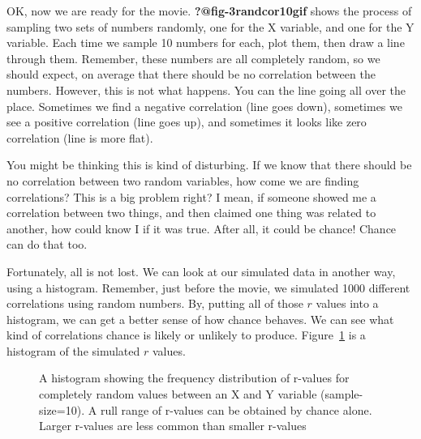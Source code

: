 \documentclass[
  letterpaper,
  DIV=11,
  numbers=noendperiod]{scrreprt}
\begin{document}
OK, now we are ready for the movie. \textbf{?@fig-3randcor10gif} shows
the process of sampling two sets of numbers randomly, one for the X
variable, and one for the Y variable. Each time we sample 10 numbers for
each, plot them, then draw a line through them. Remember, these numbers
are all completely random, so we should expect, on average that there
should be no correlation between the numbers. However, this is not what
happens. You can the line going all over the place. Sometimes we find a
negative correlation (line goes down), sometimes we see a positive
correlation (line goes up), and sometimes it looks like zero correlation
(line is more flat).

You might be thinking this is kind of disturbing. If we know that there
should be no correlation between two random variables, how come we are
finding correlations? This is a big problem right? I mean, if someone
showed me a correlation between two things, and then claimed one thing
was related to another, how could know I if it was true. After all, it
could be chance! Chance can do that too.

Fortunately, all is not lost. We can look at our simulated data in
another way, using a histogram. Remember, just before the movie, we
simulated 1000 different correlations using random numbers. By, putting
all of those \(r\) values into a histogram, we can get a better sense of
how chance behaves. We can see what kind of correlations chance is
likely or unlikely to produce. Figure~\ref{fig-3histrandcor} is a
histogram of the simulated \(r\) values.

\begin{figure}


\caption{\label{fig-3histrandcor}A histogram showing the frequency
distribution of r-values for completely random values between an X and Y
variable (sample-size=10). A rull range of r-values can be obtained by
chance alone. Larger r-values are less common than smaller r-values}

\end{figure}%
\end{document}
